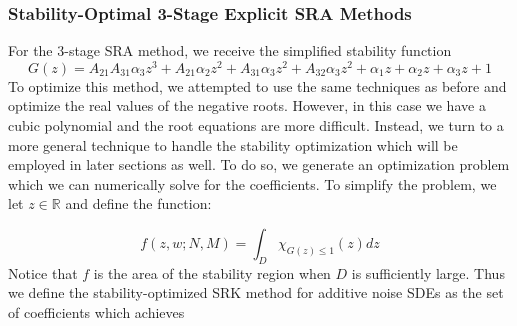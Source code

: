 \documentclass{article}
\begin{document}
\subsubsection{Stability-Optimal 3-Stage Explicit SRA Methods}

For the 3-stage SRA method, we receive the simplified stability function
\begin{equation}
G(z)=A_{21}A_{31}\alpha_{3}z^{3}+A_{21}\alpha_{2}z^{2}+A_{31}\alpha_{3}z^{2}+A_{32}\alpha_{3}z^{2}+\alpha_{1}z+\alpha_{2}z+\alpha_{3}z+1\label{eq:SRA_stab_3}
\end{equation}
To optimize this method, we attempted to use the same techniques
as before and optimize the real values of the negative roots. However,
in this case we have a cubic polynomial and the root equations are
more difficult. Instead, we turn to a more general technique to handle
the stability optimization which will be employed in later sections
as well. To do so, we generate an optimization problem which we can
numerically solve for the coefficients. To simplify the problem, we
let $z\in\mathbb{R}$ and define the function:

\begin{equation}
f\left(z,w;N,M\right)=\int_{D}\chi_{G(z)\leq1}(z)dz\label{eq:SRA_integral}
\end{equation}
Notice that $f$ is the area of the stability region when $D$ is
sufficiently large. Thus we define the stability-optimized SRK method
for additive noise SDEs as the set of coefficients which achieves
\end{document}
